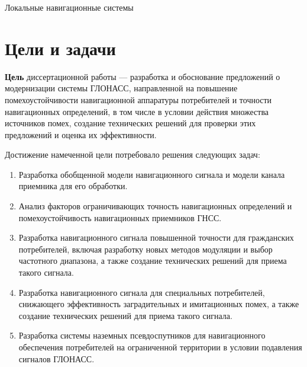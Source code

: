  
Локальные навигационные системы \cite{wang2020} 

\section*{Цели и задачи}

\textbf{Цель} диссертационной работы --- разработка и обоснование предложений о модернизации системы ГЛОНАСС, направленной на повышение помехоустойчивости навигационной аппаратуры потребителей и точности навигационных определений, в том числе в условии действия множества источников помех, создание технических решений для проверки этих предложений и оценка их эффективности.


Достижение намеченной цели потребовало решения следующих задач:

\begin{enumerate}
\item Разработка обобщенной модели навигационного сигнала и модели канала приемника для его обработки.
\item Анализ факторов ограничивающих точность навигационных определений и помехоустойчивость навигационных приемников ГНСС.
\item Разработка навигационного сигнала повышенной точности для гражданских потребителей, включая разработку новых методов модуляции и выбор частотного диапазона, а также создание технических решений для приема такого сигнала.
\item Разработка навигационного сигнала для специальных потребителей, снижающего эффективность заградительных и имитационных помех, а также создание технических решений для приема такого сигнала.
\item Разработка системы наземных псевдоспутников для навигационного обеспечения потребителей на ограниченной территории в условии подавления сигналов ГЛОНАСС.
\end{enumerate}

